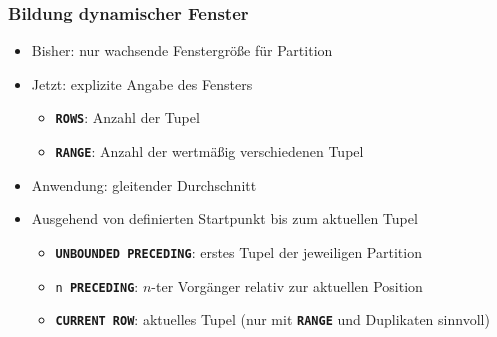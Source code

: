     \begin{frame}
    
    \frametitle{Bildung dynamischer Fenster}
    \begin{itemize}
    \item Bisher: nur wachsende Fenstergröße für Partition
    \item Jetzt: explizite Angabe des Fensters
      \begin{itemize}
      \item \texttt{\textbf{ROWS}}: Anzahl der Tupel
      \item \texttt{\textbf{RANGE}}: Anzahl der wertmäßig verschiedenen
        Tupel
      \end{itemize}
    \item Anwendung: gleitender Durchschnitt
    \item Ausgehend von definierten Startpunkt bis zum aktuellen Tupel
      \begin{itemize}
      \item \texttt{\textbf{UNBOUNDED PRECEDING}}: erstes Tupel der
        jeweiligen Partition
      \item \texttt{n \textbf{PRECEDING}}: $n$-ter Vorgänger relativ zur
        aktuellen Position
      \item \texttt{\textbf{CURRENT ROW}}: aktuelles Tupel (nur mit
        \texttt{\textbf{RANGE}} und Duplikaten sinnvoll)
      \end{itemize}
    
    \end{itemize}
    
    \end{frame}
    
    
